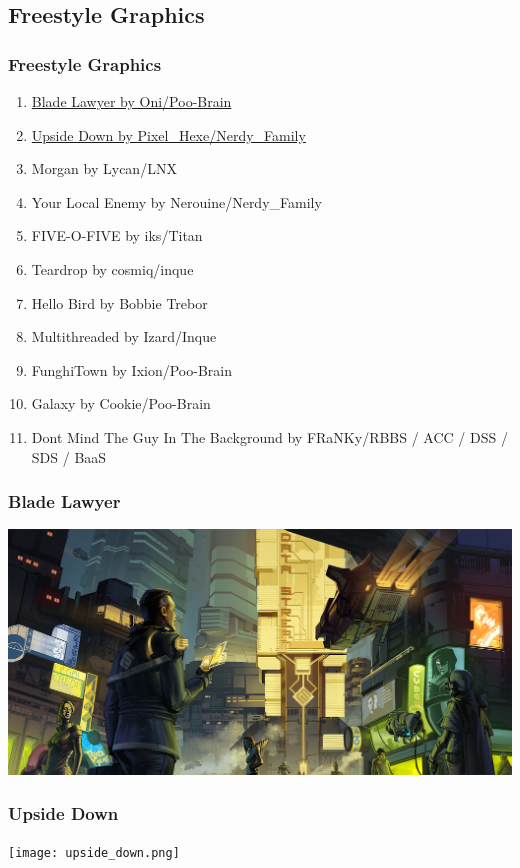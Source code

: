 \documentclass{beamer}
\begin{document}
\subsection{Freestyle Graphics}
\begin{frame}
  \frametitle{Freestyle Graphics}
  \begin{enumerate}
  \item \href{https://demozoo.org/graphics/191951/}{Blade Lawyer by Oni/Poo-Brain}
  \item \href{https://demozoo.org/graphics/191950/}{Upside Down by Pixel\_Hexe/Nerdy\_Family}
  \item Morgan by Lycan/LNX
  \item Your Local Enemy by Nerouine/Nerdy\_Family
  \item FIVE-O-FIVE by iks/Titan
  \item Teardrop by cosmiq/inque
  \item Hello Bird by Bobbie Trebor
  \item Multithreaded by Izard/Inque
  \item FunghiTown by Ixion/Poo-Brain
  \item Galaxy by Cookie/Poo-Brain
  \item Dont Mind The Guy In The Background by FRaNKy/RBBS / ACC / DSS / SDS / BaaS
  \end{enumerate}
\end{frame}

\begin{frame}
  \frametitle{Blade Lawyer}
  \includegraphics[width=\textwidth]{BladeLawyer_Step_Final.png}
\end{frame}

\begin{frame}
  \frametitle{Upside Down}
  \begin{center}
  \texttt{[image: upside\_down.png]}
  \end{center}
\end{frame}
\end{document}
